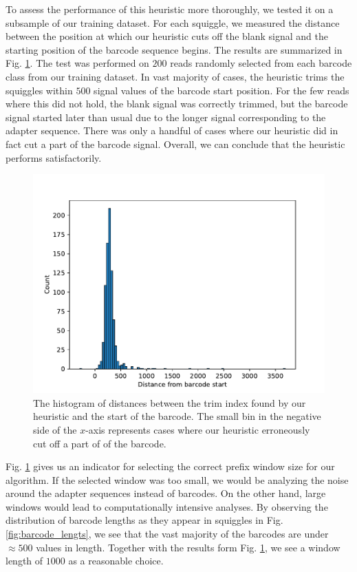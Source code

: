 To assess the performance of this heuristic more thoroughly, we tested it on a subsample of our training dataset. For each squiggle, we measured the distance between the position at which our heuristic cuts off the blank signal and the starting position of the barcode sequence begins. The results are summarized in Fig. \ref{fig:trim_errors}. The test was performed on $200$ reads randomly selected from each barcode class from our training dataset. In vast majority of cases, the heuristic trims the squiggles within $500$ signal values of the barcode start position. For the few reads where this did not hold, the blank signal was correctly trimmed, but the barcode signal started later than usual due to the longer signal corresponding to the adapter sequence. There was only a handful of cases where our heuristic did in fact cut a part of the barcode signal. Overall, we can conclude that the heuristic performs satisfactorily.


\begin{figure}[!ht]
    \centering
    \includegraphics[scale=0.8]{images/trimmer_test.pdf}
    \caption[Histogram of blank prefix trims]{The histogram of distances between the trim index found by our heuristic and the start of the barcode. The small bin in the negative side of the $x$-axis represents cases where our heuristic erroneously cut off a part of of the barcode.}
    \label{fig:trim_errors}
\end{figure}

Fig. \ref{fig:trim_errors} gives us an indicator for selecting the correct prefix window size for our algorithm. If the selected window was too small, we would be analyzing the noise around the adapter sequences instead of barcodes. On the other hand, large windows would lead to computationally intensive analyses. By observing the distribution of barcode lengths as they appear in squiggles in Fig. \ref{fig:barcode_lengts}, we see that the vast majority of the barcodes are under $\approx 500$ values in length. Together with the results form Fig. \ref{fig:trim_errors}, we see a window length of $1000$ as a reasonable choice.

